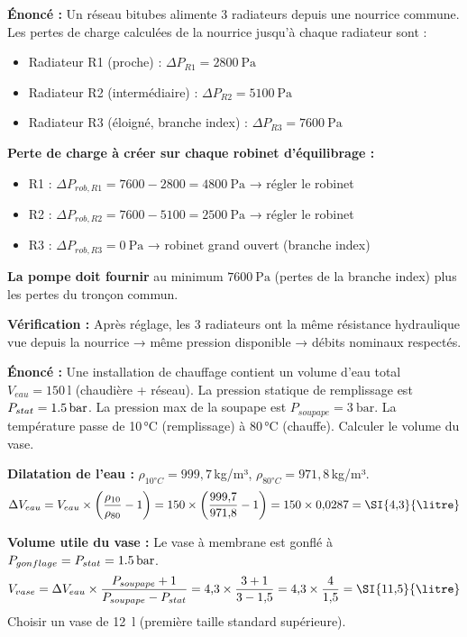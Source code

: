 \begin{exemple}[title=Équilibrage d'un réseau bitubes — 3 radiateurs]
\textbf{Énoncé :} Un réseau bitubes alimente 3 radiateurs depuis une nourrice commune. Les pertes de charge calculées de la nourrice jusqu'à chaque radiateur sont :
\begin{itemize}
  \item Radiateur R1 (proche) : $\Delta P_{R1} = \SI{2800}{\pascal}$
  \item Radiateur R2 (intermédiaire) : $\Delta P_{R2} = \SI{5100}{\pascal}$
  \item Radiateur R3 (éloigné, branche index) : $\Delta P_{R3} = \SI{7600}{\pascal}$
\end{itemize}

\textbf{Perte de charge à créer sur chaque robinet d'équilibrage :}
\begin{itemize}
  \item R1 : $\Delta P_{rob,R1} = 7600 - 2800 = \SI{4800}{\pascal}$ → régler le robinet
  \item R2 : $\Delta P_{rob,R2} = 7600 - 5100 = \SI{2500}{\pascal}$ → régler le robinet
  \item R3 : $\Delta P_{rob,R3} = \SI{0}{\pascal}$ → robinet grand ouvert (branche index)
\end{itemize}

\textbf{La pompe doit fournir} au minimum $\SI{7600}{\pascal}$ (pertes de la branche index) plus les pertes du tronçon commun.

\textbf{Vérification :} Après réglage, les 3 radiateurs ont la même résistance hydraulique vue depuis la nourrice → même pression disponible → débits nominaux respectés.
\end{exemple}

\begin{exemple}[title=Dimensionnement d'un vase d'expansion]
\textbf{Énoncé :} Une installation de chauffage contient un volume d'eau total $V_{eau} = \SI{150}{\litre}$ (chaudière + réseau). La pression statique de remplissage est $P_{stat} = \SI{1{,}5}{\bar}$. La pression max de la soupape est $P_{soupape} = \SI{3}{\bar}$. La température passe de 10\,°C (remplissage) à 80\,°C (chauffe). Calculer le volume du vase.

\textbf{Dilatation de l'eau :} $\rho_{10°C} = 999{,}7$\,kg/m³, $\rho_{80°C} = 971{,}8$\,kg/m³.
\[
  \Delta V_{eau} = V_{eau} \times \left(\frac{\rho_{10}}{\rho_{80}} - 1\right) = 150 \times \left(\frac{999{,}7}{971{,}8} - 1\right) = 150 \times 0{,}0287 = \SI{4{,}3}{\litre}
\]

\textbf{Volume utile du vase :}
Le vase à membrane est gonflé à $P_{gonflage} = P_{stat} = \SI{1{,}5}{\bar}$.
\[
  V_{vase} = \Delta V_{eau} \times \frac{P_{soupape} + 1}{P_{soupape} - P_{stat}} = 4{,}3 \times \frac{3 + 1}{3 - 1{,}5} = 4{,}3 \times \frac{4}{1{,}5} = \SI{11{,}5}{\litre}
\]
Choisir un vase de \SI{12}{\litre} (première taille standard supérieure).
\end{exemple}

